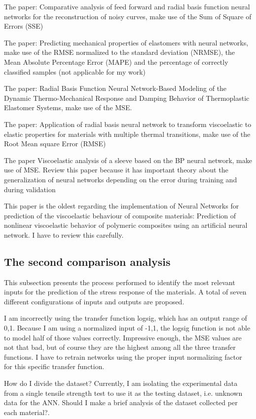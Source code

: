 The paper: Comparative analysis of feed forward and radial basis function neural networks for the reconstruction of noisy curves, make use of the Sum of Square of Errors (SSE)

The paper: Predicting mechanical properties of elastomers with neural networks, make use of the RMSE normalized to the standard deviation (NRMSE), the Mean Absolute Percentage Error (MAPE) and the percentage of correctly classified samples (not applicable for my work)

The paper: Radial Basis Function Neural Network-Based Modeling of the Dynamic Thermo-Mechanical Response and Damping Behavior of Thermoplastic Elastomer Systems, make use of the MSE.

The paper: Application of radial basis neural network to transform viscoelastic to elastic properties for materials with multiple thermal transitions, make use of the Root Mean square Error (RMSE)

The paper Viscoelastic analysis of a sleeve based on the BP neural network, make use of MSE. Review this paper because it has important theory about the generalization of neural networks depending on the error during training and during validation

This paper is the oldest regarding the implementation of Neural Networks for prediction of the viscoelastic behaviour of composite materials: Prediction of nonlinear viscoelastic behavior of polymeric composites using an artificial neural network. I have to review this carefully.

\subsection{The second comparison analysis}

This subsection presents the process performed to identify the most relevant inputs for the prediction of the stress response of the materials. A total of seven different configurations of inputs and outputs are proposed.

I am incorrectly using the transfer function logsig, which has an output range of {0,1}. Because I am using a normalized input of {-1,1}, the logsig function is not able to model half of those values correctly. Impressive enough, the MSE values are not that bad, but of course they are the highest among all the three transfer functions. I have to retrain networks using the proper input normalizing factor for this specific transfer function.

How do I divide the dataset? Currently, I am isolating the experimental data from a single tensile strength test to use it as the testing dataset, i.e. unknown data for the ANN. Should I make a brief analysis of the dataset collected per each material?.